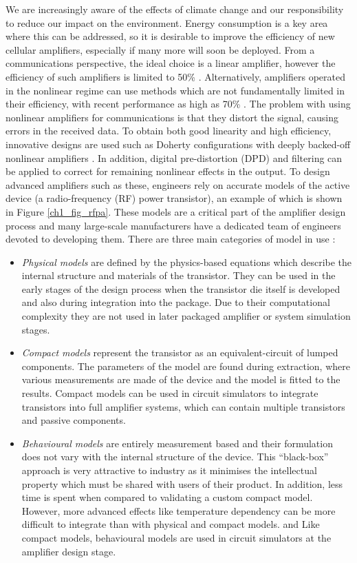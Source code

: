 \documentclass[../thesis/thesis.tex]{subfiles}
\begin{document}
We are increasingly aware of the effects of climate change and our responsibility to reduce our impact on the environment. Energy consumption is a key area where this can be addressed, so it is desirable to improve the efficiency of new cellular amplifiers, especially if many more will soon be deployed. From a communications perspective, the ideal choice is a linear amplifier, however the efficiency of such amplifiers is limited to 50\% \cite{Cripps_2006}. Alternatively, amplifiers operated in the nonlinear regime can use methods which are not fundamentally limited in their efficiency, with recent performance as high as 70\% \cite{Kosaka_2016,Bhardwaj_2019}. The problem with using nonlinear amplifiers for communications is that they distort the signal, causing errors in the received data. To obtain both good linearity and high efficiency, innovative designs are used such as Doherty configurations with deeply backed-off nonlinear amplifiers \cite{Camarchia_2015}. In addition, digital pre-distortion (DPD) and filtering can be applied to correct for remaining nonlinear effects in the output. To design advanced amplifiers such as these, engineers rely on accurate models of the active device (a radio-frequency (RF) power transistor), an example of which is shown in Figure \ref{ch1_fig_rfpa}. These models are a critical part of the amplifier design process and many large-scale manufacturers have a dedicated team of engineers devoted to developing them. There are three main categories of model in use \cite{Aaen_2007}:

\begin{itemize}
	\item \emph{Physical models} are defined by the physics-based equations which describe the internal structure and materials of the transistor. They can be used in the early stages of the design process when the transistor die itself is developed and also during integration into the package. Due to their computational complexity they are not used in later packaged amplifier or system simulation stages.
	\item \emph{Compact models} represent the transistor as an equivalent-circuit of lumped components. The parameters of the model are found during extraction, where various measurements are made of the device and the model is fitted to the results. Compact models can be used in circuit simulators to integrate transistors into full amplifier systems, which can contain multiple transistors and passive components.
	\item \emph{Behavioural models} are entirely measurement based and their formulation does not vary with the internal structure of the device. This ``black-box'' approach is very attractive to industry as it minimises the intellectual property which must be shared with users of their product. In addition, less time is spent when compared to validating a custom compact model. However, more advanced effects like temperature dependency can be more difficult to integrate than with physical and compact models. and Like compact models, behavioural models are used in circuit simulators at the amplifier design stage.
\end{itemize}
\end{document}
